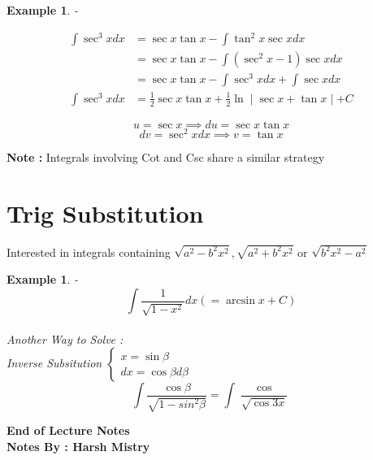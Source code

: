 \documentclass{article}
\newtheorem{ex}[theorem]{Example}
\begin{document}
\begin{ex} - \\
\begin{minipage}{.5\textwidth} %
$$
\begin{aligned}
\int \sec ^3 x dx & = \sec x \tan x - \int \tan ^2 x \sec x dx \\
& = \sec x \tan x  - \int (\sec ^2 x - 1) \sec x dx \\
& = \sec x \tan x - \int \sec ^3 x dx + \int \sec x dx \\
\int \sec ^3 x dx  & = \frac{1}{2} \sec x \tan x + \frac{1}{2} \ln \mid \sec x + \tan x \mid + C
\end{aligned}
$$
\end{minipage} %
\begin{minipage}{.5\textwidth} %

$$ u = \sec x \implies  du = \sec x \tan x $$
$$ dv = \sec ^2 x dx \implies v = \tan x $$
\end{minipage}
\end{ex}

\textbf{Note : } Integrals involving Cot and Csc share a similar strategy 

\section{Trig Substitution}
Interested in integrals containing \( \sqrt{a^2 - b^2 x^2} , \sqrt{a^2+b^2x^2} \text { or } \sqrt{b^2x^2 - a^2} \)

\begin{ex} -\\
\[ \int \frac{1}{\sqrt{1 -x^2}} dx  ( = \arcsin x + C ) \] \\
Another Way to Solve : \\
Inverse Subsitution \( \begin{cases} x = \sin \beta \\ dx = \cos \beta d\beta \end{cases} \) \\
\[ \int \frac{\cos \beta}{\sqrt{1 - sin ^2 \beta}} = \int \frac{\cos}{\sqrt{\cos 3x}} \]
\end{ex}


\begin{center}
\textbf{End of Lecture Notes} \\
\textbf{Notes By : Harsh Mistry}
\end{center}
\end{document}
